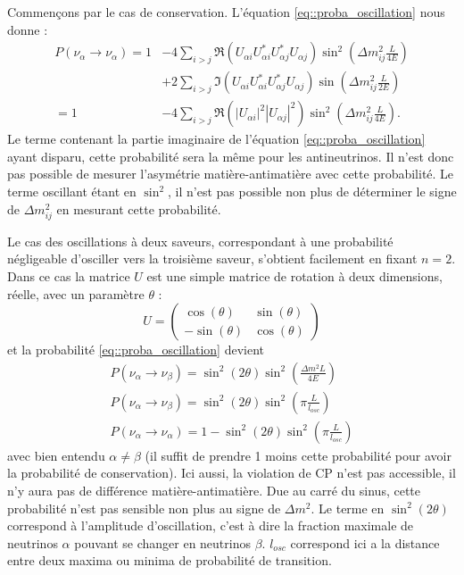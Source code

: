         Commençons par le cas de conservation. L'équation \eqref{eq::proba_oscillation} nous donne :
        \begin{equation}\label{eq::proba_non_oscillation}
          \begin{split}
            P(\nu_{\alpha}\to\nu_{\alpha}) = 1 & - 4\sum_{i>j}\Re(U_{\alpha i}U_{\alpha i}^*U_{\alpha j}^*U_{\alpha j})\sin^2\left(\Delta m_{ij}^2\frac{L}{4E}\right) \\
            & + 2\sum_{i>j}\Im(U_{\alpha i}U_{\alpha i}^*U_{\alpha j}^*U_{\alpha j})\sin\left(\Delta m_{ij}^2\frac{L}{2E}\right) \\
            = 1 & -4\sum_{i>j}\Re(|U_{\alpha i}|^2|U_{\alpha j}|^2)\sin^2\left(\Delta m_{ij}^2\frac{L}{4E}\right).
          \end{split}
        \end{equation}
        Le terme contenant la partie imaginaire de l'équation \eqref{eq::proba_oscillation} ayant disparu, cette probabilité sera la même pour les antineutrinos. Il n'est donc pas possible de mesurer l'asymétrie matière-antimatière avec cette probabilité. Le terme oscillant étant en $\sin^2$, il n'est pas possible non plus de déterminer le signe de $\Delta m_{ij}^2$ en mesurant cette probabilité.
        
        Le cas des oscillations à deux saveurs, correspondant à une probabilité négligeable d'osciller vers la troisième saveur, s'obtient facilement en fixant $n=2$. Dans ce cas la matrice $U$ est une simple matrice de rotation à deux dimensions, réelle, avec un paramètre $\theta$ :
        \begin{equation}\label{eq::two_flavor_pmns}
          U = \left(\begin{matrix}
            \cos(\theta) & \sin(\theta) \\
            -\sin(\theta) & \cos(\theta)
          \end{matrix}\right)
        \end{equation}
        et la probabilité \eqref{eq::proba_oscillation} devient
        \begin{eqnarray}
          \label{eq::two_flavors}
          P(\nu_{\alpha}\to\nu_{\beta}) = \sin^2(2\theta)\sin^2\left(\frac{\Delta m^2 L}{4E}\right) \\ 
          \label{eq::two_flavors_length}
          P(\nu_{\alpha}\to\nu_{\beta}) = \sin^2(2\theta)\sin^2\left(\pi\frac{L}{l_{osc}}\right) \\
          \label{eq::two_flavors_survival}
          P(\nu_{\alpha}\to\nu_{\alpha}) = 1- \sin^2(2\theta)\sin^2\left(\pi\frac{L}{l_{osc}}\right)
        \end{eqnarray}
        avec bien entendu $\alpha\ne \beta$ (il suffit de prendre 1 moins cette probabilité pour avoir la probabilité de conservation). Ici aussi, la violation de CP n'est pas accessible, il n'y aura pas de différence matière-antimatière. Due au carré du sinus, cette probabilité n'est pas sensible non plus au signe de $\Delta m^2$. Le terme en $\sin^2(2\theta)$ correspond à l'amplitude d'oscillation, c'est à dire la fraction maximale de neutrinos $\alpha$ pouvant se changer en neutrinos $\beta$. $l_{osc}$ correspond ici a la distance entre deux maxima ou minima de probabilité de transition.
        
